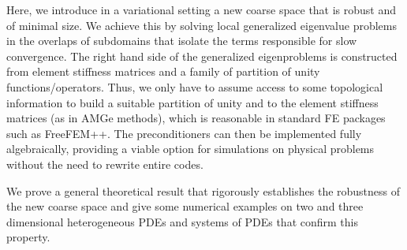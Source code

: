 \documentclass{report}
\begin{document}
Here, we introduce in a variational setting a new coarse space that is
robust and of minimal size. We achieve this by solving local generalized
eigenvalue problems in the overlaps of subdomains that isolate the terms
responsible for slow convergence. The right hand side of the generalized
eigenproblems is constructed from element stiffness matrices and a family
of partition of unity functions/operators. Thus, we only have to assume
access to some topological information to build a suitable partition of
unity and to the element stiffness matrices (as in AMGe methods), which
is reasonable in standard FE packages such as FreeFEM++. The
preconditioners can then be implemented fully algebraically, providing a
viable option for simulations on physical problems without the need to
rewrite entire codes.

We prove a general theoretical result that rigorously establishes the
robustness of the new coarse space and give some numerical examples on
two and three dimensional heterogeneous PDEs and systems of PDEs that
confirm this property.
\end{document}
